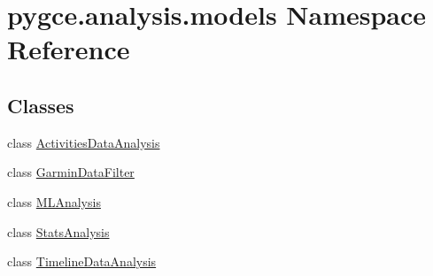 \hypertarget{namespacepygce_1_1analysis_1_1models}{}\section{pygce.\+analysis.\+models Namespace Reference}
\label{namespacepygce_1_1analysis_1_1models}
\subsection*{Classes}
\begin{DoxyCompactItemize}
\item 
class \hyperlink{classpygce_1_1analysis_1_1models_1_1_activities_data_analysis}{Activities\+Data\+Analysis}
\item 
class \hyperlink{classpygce_1_1analysis_1_1models_1_1_garmin_data_filter}{Garmin\+Data\+Filter}
\item 
class \hyperlink{classpygce_1_1analysis_1_1models_1_1_m_l_analysis}{M\+L\+Analysis}
\item 
class \hyperlink{classpygce_1_1analysis_1_1models_1_1_stats_analysis}{Stats\+Analysis}
\item 
class \hyperlink{classpygce_1_1analysis_1_1models_1_1_timeline_data_analysis}{Timeline\+Data\+Analysis}
\end{DoxyCompactItemize}
